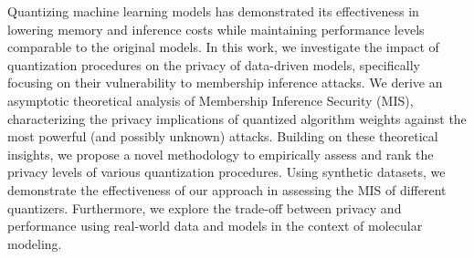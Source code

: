 Quantizing machine learning models has demonstrated its effectiveness in lowering memory and inference costs while maintaining performance levels comparable to the original models.
In this work, we investigate the impact of quantization procedures on the privacy of data-driven models, specifically focusing on their vulnerability to membership inference attacks.
We derive an asymptotic theoretical analysis of Membership Inference Security (MIS), characterizing the privacy implications of quantized algorithm weights against the most powerful (and possibly unknown) attacks. Building on these theoretical insights, we propose a novel methodology to empirically assess and rank the privacy levels of various quantization procedures. Using synthetic datasets, we demonstrate the effectiveness of our approach in assessing the MIS of different quantizers. Furthermore, we explore the trade-off between privacy and performance using real-world data and models in the context of molecular modeling.